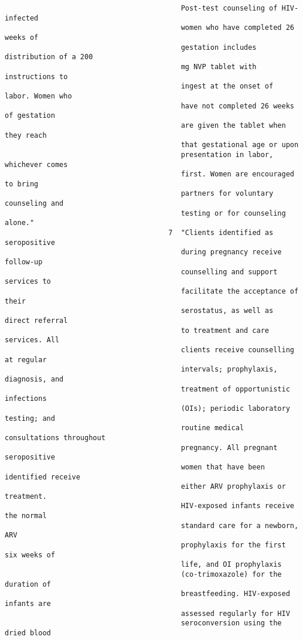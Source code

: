 \documentclass{article}
\begin{document}
\begin{verbatim}
                                          Post-test counseling of HIV-infected
                                          women who have completed 26 weeks of
                                          gestation includes distribution of a 200
                                          mg NVP tablet with instructions to
                                          ingest at the onset of labor. Women who
                                          have not completed 26 weeks of gestation
                                          are given the tablet when they reach
                                          that gestational age or upon
                                          presentation in labor, whichever comes
                                          first. Women are encouraged to bring
                                          partners for voluntary counseling and
                                          testing or for counseling alone."
                                       7  "Clients identified as seropositive
                                          during pregnancy receive follow-up
                                          counselling and support services to
                                          facilitate the acceptance of their
                                          serostatus, as well as direct referral
                                          to treatment and care services. All
                                          clients receive counselling at regular
                                          intervals; prophylaxis, diagnosis, and
                                          treatment of opportunistic infections
                                          (OIs); periodic laboratory testing; and
                                          routine medical consultations throughout
                                          pregnancy. All pregnant seropositive
                                          women that have been identified receive
                                          either ARV prophylaxis or treatment.
                                          HIV-exposed infants receive the normal
                                          standard care for a newborn, ARV
                                          prophylaxis for the first six weeks of
                                          life, and OI prophylaxis
                                          (co-trimoxazole) for the duration of
                                          breastfeeding. HIV-exposed infants are
                                          assessed regularly for HIV
                                          seroconversion using the dried blood

\end{verbatim}
\end{document}

